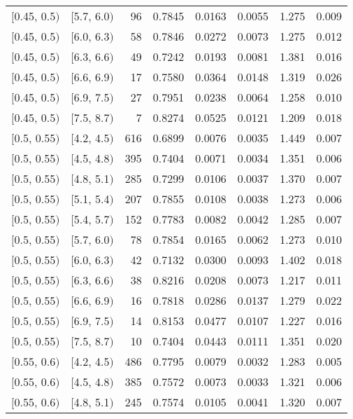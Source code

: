\begin{longtable}{| l | l | r | r | r | r | r | r |}
        $[$0.45, 0.5$)$ & $[$5.7, 6.0$)$ & 96 & 0.7845 & 0.0163 & 0.0055 & 1.275 & 0.009 \\
        $[$0.45, 0.5$)$ & $[$6.0, 6.3$)$ & 58 & 0.7846 & 0.0272 & 0.0073 & 1.275 & 0.012 \\
        $[$0.45, 0.5$)$ & $[$6.3, 6.6$)$ & 49 & 0.7242 & 0.0193 & 0.0081 & 1.381 & 0.016 \\
        $[$0.45, 0.5$)$ & $[$6.6, 6.9$)$ & 17 & 0.7580 & 0.0364 & 0.0148 & 1.319 & 0.026 \\
        $[$0.45, 0.5$)$ & $[$6.9, 7.5$)$ & 27 & 0.7951 & 0.0238 & 0.0064 & 1.258 & 0.010 \\
        $[$0.45, 0.5$)$ & $[$7.5, 8.7$)$ & 7 & 0.8274 & 0.0525 & 0.0121 & 1.209 & 0.018 \\
        $[$0.5, 0.55$)$ & $[$4.2, 4.5$)$ & 616 & 0.6899 & 0.0076 & 0.0035 & 1.449 & 0.007 \\
        $[$0.5, 0.55$)$ & $[$4.5, 4.8$)$ & 395 & 0.7404 & 0.0071 & 0.0034 & 1.351 & 0.006 \\
        $[$0.5, 0.55$)$ & $[$4.8, 5.1$)$ & 285 & 0.7299 & 0.0106 & 0.0037 & 1.370 & 0.007 \\
        $[$0.5, 0.55$)$ & $[$5.1, 5.4$)$ & 207 & 0.7855 & 0.0108 & 0.0038 & 1.273 & 0.006 \\
        $[$0.5, 0.55$)$ & $[$5.4, 5.7$)$ & 152 & 0.7783 & 0.0082 & 0.0042 & 1.285 & 0.007 \\
        $[$0.5, 0.55$)$ & $[$5.7, 6.0$)$ & 78 & 0.7854 & 0.0165 & 0.0062 & 1.273 & 0.010 \\
        $[$0.5, 0.55$)$ & $[$6.0, 6.3$)$ & 42 & 0.7132 & 0.0300 & 0.0093 & 1.402 & 0.018 \\
        $[$0.5, 0.55$)$ & $[$6.3, 6.6$)$ & 38 & 0.8216 & 0.0208 & 0.0073 & 1.217 & 0.011 \\
        $[$0.5, 0.55$)$ & $[$6.6, 6.9$)$ & 16 & 0.7818 & 0.0286 & 0.0137 & 1.279 & 0.022 \\
        $[$0.5, 0.55$)$ & $[$6.9, 7.5$)$ & 14 & 0.8153 & 0.0477 & 0.0107 & 1.227 & 0.016 \\
        $[$0.5, 0.55$)$ & $[$7.5, 8.7$)$ & 10 & 0.7404 & 0.0443 & 0.0111 & 1.351 & 0.020 \\
        $[$0.55, 0.6$)$ & $[$4.2, 4.5$)$ & 486 & 0.7795 & 0.0079 & 0.0032 & 1.283 & 0.005 \\
        $[$0.55, 0.6$)$ & $[$4.5, 4.8$)$ & 385 & 0.7572 & 0.0073 & 0.0033 & 1.321 & 0.006 \\
        $[$0.55, 0.6$)$ & $[$4.8, 5.1$)$ & 245 & 0.7574 & 0.0105 & 0.0041 & 1.320 & 0.007 \\

\end{longtable}
